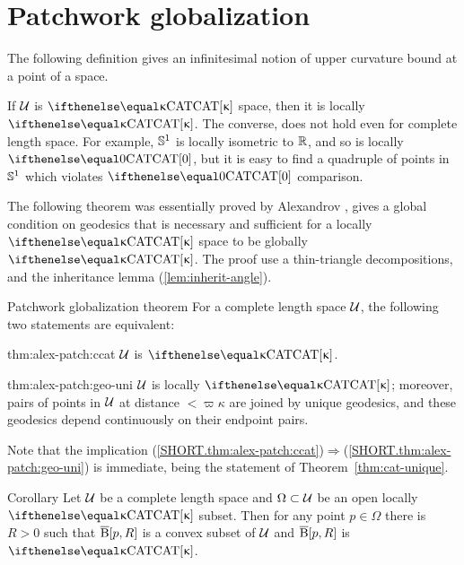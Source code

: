 
\section{Patchwork globalization}\label{sec:patchwork}

The following definition gives an infinitesimal 
 notion of upper curvature bound at a point of a space.
 


If $\mathcal{U}$ is $\CAT\kappa$ space, then it is locally $\CAT\kappa$.
The converse, does not hold even for complete length space.
For example, $\mathbb{S}^1$ is locally isometric to $\mathbb{R}$, and so
is locally $\CAT0$, but it is easy to find a quadruple of points in $\mathbb{S}^1$ which violates $\CAT0$ comparison.  

The following theorem was essentially proved by Alexandrov \cite[Satz 9]{alexandrov:devel}, 
gives a global condition on geodesics that is  necessary and sufficient for a locally $\CAT\kappa$ space to be globally $\CAT\kappa$. 
The proof use a thin-triangle decompositions, 
and the inheritance lemma (\ref{lem:inherit-angle}). 

\begin{thm}{Patchwork globalization theorem}\label{thm:alex-patch}
For a complete length space $\mathcal{U}$, the following two statements are equivalent:

\begin{subthm}{thm:alex-patch:ccat}
$\mathcal{U}$ is $\CAT\kappa$.
\end{subthm}
 
\begin{subthm}{thm:alex-patch:geo-uni}
$\mathcal{U}$ is locally $\CAT\kappa$; moreover,  pairs of points in $\mathcal{U}$ at distance $<\varpi\kappa$ are joined by unique geodesics, and these geodesics depend continuously on their endpoint pairs.
\end{subthm}

\end{thm}

Note that the implication (\ref{SHORT.thm:alex-patch:ccat})$\Rightarrow$(\ref{SHORT.thm:alex-patch:geo-uni})
is immediate, being the statement of Theorem~\ref{thm:cat-unique}.

\begin{thm}{Corollary}\label{cor:k-for-k}
Let $\mathcal{U}$ be a complete length  space 
and $\Omega\subset\spc{U}$ be an open locally $\CAT\kappa$ subset. 
Then for any point $p\in \Omega$ there is $R>0$ such that $\overline{\mathrm{B}}{}[p,R]$ is a convex subset of $\mathcal{U}$ 
and $\overline{\mathrm{B}}{}[p,R]$ is $\CAT\kappa$.
\end{thm}

